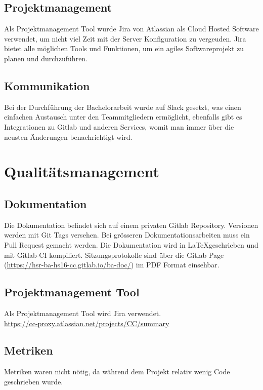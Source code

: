 \subsection{Projektmanagement}
Als Projektmanagement Tool wurde Jira von Atlassian als Cloud Hosted Software verwendet, um  
nicht viel Zeit mit der Server Konfiguration zu vergeuden.
Jira bietet alle möglichen Tools und Funktionen, um ein agiles Softwareprojekt 
zu planen und durchzuführen.

\subsection{Kommunikation}
Bei der Durchführung  der Bachelorarbeit wurde auf Slack gesetzt, was einen 
einfachen Austausch unter den Teammitgliedern ermöglicht, ebenfalls gibt es Integrationen zu 
Gitlab und anderen Services, womit man immer über die neusten Änderungen benachrichtigt 
wird.


\section{Qualitätsmanagement}

\subsection{Dokumentation}
Die Dokumentation befindet sich auf einem privaten Gitlab Repository. 
Versionen werden mit Git Tags versehen. Bei grösseren Dokumentationsarbeiten muss ein Pull Request gemacht werden. Die Dokumentation wird in \LaTeX geschrieben und mit Gitlab-CI kompiliert. Sitzungsprotokolle sind über die Gitlab Page (\href{https://hsr-ba-hs16-cc.gitlab.io/ba-doc/}{https://hsr-ba-hs16-cc.gitlab.io/ba-doc/}) im PDF Format einsehbar. 

\subsection{Projektmanagement Tool}
Als Projektmanagement Tool wird Jira verwendet.\\
\href{https://cc-proxy.atlassian.net/projects/CC/summary}{https://cc-proxy.atlassian.net/projects/CC/summary}

\subsection{Metriken}
Metriken waren nicht nötig, da während dem Projekt relativ wenig Code geschrieben wurde.

